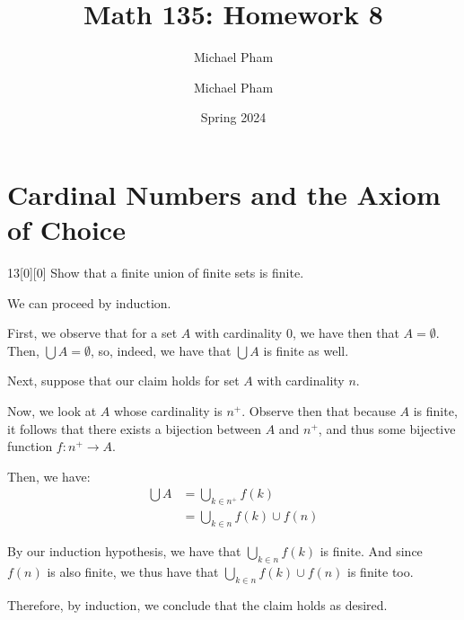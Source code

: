 \documentclass{article}
\title{#1}
\author{Michael Pham}
\date{#2}
\renewcommand{\mytitle}[2]{%
	\title{#1}
	\author{Michael Pham}
	\date{#2}
	\maketitle
	\newpage
	\listoftheorems
	\newpage
}
\begin{document}
\mytitle{Math 135: Homework 8}{Spring 2024}

\setcounter{section}{5}
\section{Cardinal Numbers and the Axiom of Choice}
\begin{hw}{13}[0][0]
	Show that a finite union of finite sets is finite.
\end{hw}
\begin{solution}
	We can proceed by induction.
	
	First, we observe that for a set $A$ with cardinality $0$, we have then that $A = \emptyset$. Then, $\bigcup A = \emptyset$, so, indeed, we have that $\bigcup A$ is finite as well.
	
	Next, suppose that our claim holds for set $A$ with cardinality $n$.
	
	Now, we look at $A$ whose cardinality is $n^{+}$. Observe then that because $A$ is finite, it follows that there exists a bijection between $A$ and $n^{+}$, and thus some bijective function $f : n^{+} \rightarrow A$.
	
	Then, we have:
	\begin{align*}
		\bigcup A &= \bigcup_{k \in n^{+}} f(k) \\
		&= \bigcup_{k \in n} f(k) \cup f(n)
	\end{align*}
	
	By our induction hypothesis, we have that $\bigcup_{k \in n} f(k)$ is finite. And since $f(n)$ is also finite, we thus have that $\bigcup_{k \in n} f(k) \cup f(n)$ is finite too.
	
	Therefore, by induction, we conclude that the claim holds as desired.
\end{solution}
\end{document}
